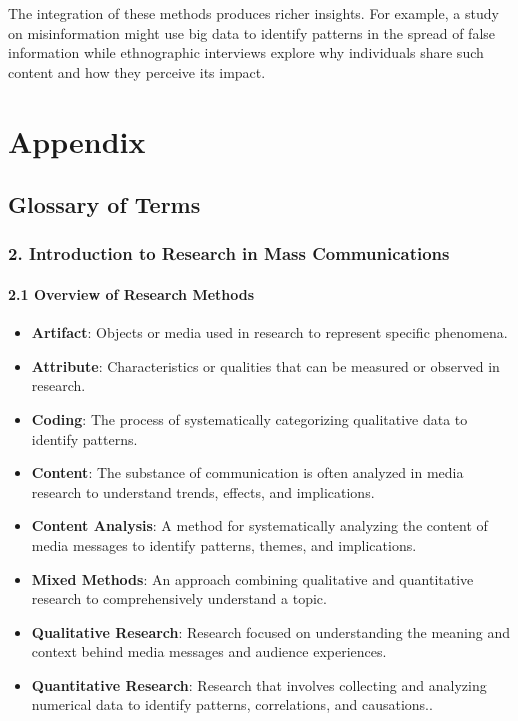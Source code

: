 \documentclass[
]{book}
\providecommand{\tightlist}{%
  \setlength{\itemsep}{0pt}\setlength{\parskip}{0pt}}
\begin{document}
The integration of these methods produces richer insights. For example, a study on misinformation might use big data to identify patterns in the spread of false information while ethnographic interviews explore why individuals share such content and how they perceive its impact.

\chapter{Appendix}\label{appendix-1}

\section{Glossary of Terms}\label{glossary-of-terms}

\subsection*{\texorpdfstring{2. \textbf{Introduction to Research in Mass Communications}}{2. Introduction to Research in Mass Communications}}\label{introduction-to-research-in-mass-communications}

\subsubsection*{\texorpdfstring{\textbf{2.1 Overview of Research Methods}}{2.1 Overview of Research Methods}}\label{overview-of-research-methods-1}

\begin{itemize}
\tightlist
\item
  \textbf{Artifact}: Objects or media used in research to represent specific phenomena.
\item
  \textbf{Attribute}: Characteristics or qualities that can be measured or observed in research.
\item
  \textbf{Coding}: The process of systematically categorizing qualitative data to identify patterns.
\item
  \textbf{Content}: The substance of communication is often analyzed in media research to understand trends, effects, and implications.
\item
  \textbf{Content Analysis}: A method for systematically analyzing the content of media messages to identify patterns, themes, and implications.
\item
  \textbf{Mixed Methods}: An approach combining qualitative and quantitative research to comprehensively understand a topic.
\item
  \textbf{Qualitative Research}: Research focused on understanding the meaning and context behind media messages and audience experiences.
\item
  \textbf{Quantitative Research}: Research that involves collecting and analyzing numerical data to identify patterns, correlations, and causations..
\end{itemize}
\end{document}
